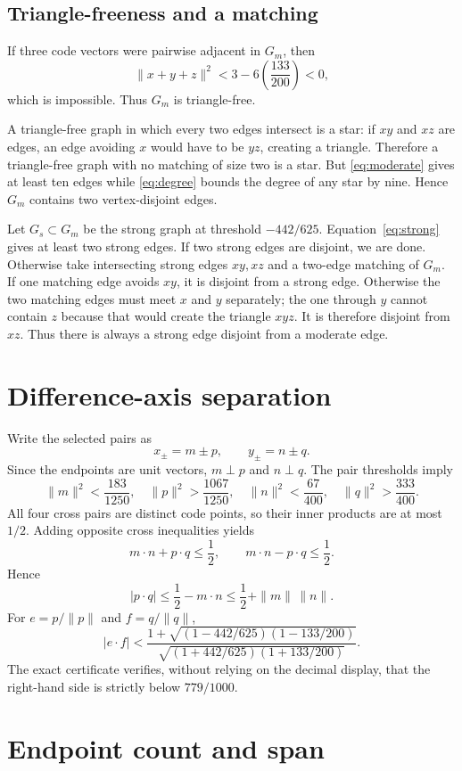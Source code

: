 \documentclass[11pt]{article}
\begin{document}
\subsection{Triangle-freeness and a matching}

If three code vectors were pairwise adjacent in $G_m$, then
\[
\|x+y+z\|^2
<
3-6\left(\frac{133}{200}\right)<0,
\]
which is impossible. Thus $G_m$ is triangle-free.

A triangle-free graph in which every two edges intersect is a star: if $xy$
and $xz$ are edges, an edge avoiding $x$ would have to be $yz$, creating a
triangle. Therefore a triangle-free graph with no matching of size two is a
star. But \eqref{eq:moderate} gives at least ten edges while
\eqref{eq:degree} bounds the degree of any star by nine. Hence $G_m$
contains two vertex-disjoint edges.

Let $G_s\subset G_m$ be the strong graph at threshold $-442/625$.
Equation~\eqref{eq:strong} gives at least two strong edges. If two strong
edges are disjoint, we are done. Otherwise take intersecting strong edges
$xy,xz$ and a two-edge matching of $G_m$. If one matching edge avoids $xy$,
it is disjoint from a strong edge. Otherwise the two matching edges must meet
$x$ and $y$ separately; the one through $y$ cannot contain $z$ because that
would create the triangle $xyz$. It is therefore disjoint from $xz$.
Thus there is always a strong edge disjoint from a moderate edge.

\section{Difference-axis separation}

Write the selected pairs as
\[
x_\pm=m\pm p,\qquad y_\pm=n\pm q.
\]
Since the endpoints are unit vectors, $m\perp p$ and $n\perp q$.
The pair thresholds imply
\[
\|m\|^2<\frac{183}{1250},\quad
\|p\|^2>\frac{1067}{1250},\quad
\|n\|^2<\frac{67}{400},\quad
\|q\|^2>\frac{333}{400}.
\]
All four cross pairs are distinct code points, so their inner products are at
most $1/2$. Adding opposite cross inequalities yields
\[
m\cdot n+p\cdot q\le\frac12,\qquad
m\cdot n-p\cdot q\le\frac12.
\]
Hence
\[
|p\cdot q|
\le\frac12-m\cdot n
\le\frac12+\|m\|\,\|n\|.
\]
For $e=p/\|p\|$ and $f=q/\|q\|$,
\[
|e\cdot f|
<
\frac{1+\sqrt{(1-442/625)(1-133/200)}}
{\sqrt{(1+442/625)(1+133/200)}}.
\]
The exact certificate verifies, without relying on the decimal display, that
the right-hand side is strictly below $779/1000$.

\section{Endpoint count and span}
\end{document}
